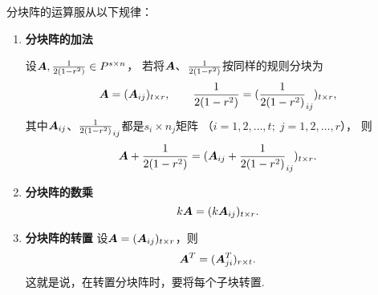 \begin{theorem}
分块阵的运算服从以下规律：
\begin{enumerate}
\item {\bf 分块阵的加法}

设\(\boldsymbol{A},\frac{1}{2(1-r^2)} \in P^{s \times n}\)，
若将\(\boldsymbol{A}\)、\(\frac{1}{2(1-r^2)}\)按同样的规则分块为
\[
    \boldsymbol{A}=(\boldsymbol{A}_{ij})_{t \times r}, \qquad
    \frac{1}{2(1-r^2)}=(\frac{1}{2(1-r^2)}_{ij})_{t \times r},
\]
其中\(\boldsymbol{A}_{ij}\)、\(\frac{1}{2(1-r^2)}_{ij}\)都是\(s_i \times n_j\)矩阵
（\(i=1,2,\dotsc,t;\;j=1,2,\dotsc,r\)），
则\[
    \boldsymbol{A}+\frac{1}{2(1-r^2)}=(\boldsymbol{A}_{ij}+\frac{1}{2(1-r^2)}_{ij})_{t \times r}.
\]

\item {\bf 分块阵的数乘}
\[
    k\boldsymbol{A}=(k\boldsymbol{A}_{ij})_{t \times r}.
\]

\item {\bf 分块阵的转置}
设\(\boldsymbol{A}=(\boldsymbol{A}_{ij})_{t \times r}\)，则\[
    \boldsymbol{A}^T=(\boldsymbol{A}_{ji}^T)_{r \times t}.
\]
这就是说，在转置分块阵时，要将每个子块转置.


\end{enumerate}
\end{theorem}
